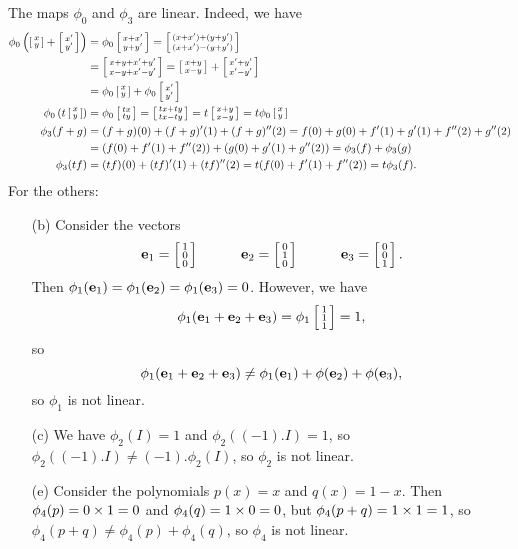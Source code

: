  The maps $\phi_0$ and $\phi_3$ are linear.  Indeed, we have
 \begin{align*}
  \phi_0\left(\bsm x\\ y\esm + \bsm x'\\ y'\esm\right) &=
  \phi_0\bsm x+x' \\ y+y' \esm =
  \bsm (x+x')+(y+y') \\ (x+x')-(y+y') \esm \\
  &= \bsm x+y+x'+y' \\ x-y+x'-y' \esm =
   \bsm x+y \\ x-y \esm + \bsm x'+y' \\ x'-y'\esm  \\
  &= \phi_0\bsm x\\ y\esm + \phi_0\bsm x'\\ y'\esm \\
  \phi_0\left(t\bsm x\\y\esm\right) &=
   \phi_0\bsm tx\\ ty \esm = \bsm tx+ty\\ tx-ty\esm =
   t\bsm x+y\\ x-y\esm = t\phi_0\bsm x\\ y\esm \\
  \phi_3(f+g) &=
   (f+g)(0) + (f+g)'(1) + (f+g)''(2)
   = f(0) + g(0) + f'(1) + g'(1) + f''(2) + g''(2) \\
   &= (f(0)+f'(1)+f''(2)) + (g(0)+g'(1)+g''(2))
    = \phi_3(f) + \phi_3(g) \\
  \phi_3(tf) &= (tf)(0) + (tf)'(1) + (tf)''(2)
    = t(f(0) + f'(1) + f''(2)) = t\phi_3(f).
 \end{align*}
 For the others:
 \begin{itemize}
  \item[(b)] Consider the vectors
   \[ \ve_1=\bsm 1\\0\\0 \esm \hspace{3em}
      \ve_2=\bsm 0\\1\\0 \esm \hspace{3em}
      \ve_3=\bsm 0\\0\\1 \esm.
   \]
   Then $\phi_1(\ve_1)=\phi_1(\ve_2)=\phi_1(\ve_3)=0$.  However,
   we have
   \[ \phi_1(\ve_1+\ve_2+\ve_3) = \phi_1\bsm 1\\1\\1\esm =  1, \]
   so
   \[ \phi_1(\ve_1+\ve_2+\ve_3)\neq
       \phi_1(\ve_1)+\phi(\ve_2)+\phi(\ve_3),
   \]
   so $\phi_1$ is not linear.
  \item[(c)] We have $\phi_2(I)=1$ and $\phi_2((-1).I)=1$,
   so $\phi_2((-1).I)\neq(-1).\phi_2(I)$, so $\phi_2$ is not
   linear.
  \item[(e)] Consider the polynomials $p(x)=x$ and
   $q(x)=1-x$.  Then $\phi_4(p)=0\tm 1=0$ and
   $\phi_4(q)=1\tm 0=0$, but $\phi_4(p+q)=1\tm 1=1$, so
   $\phi_4(p+q)\neq\phi_4(p)+\phi_4(q)$, so $\phi_4$ is not
   linear.
 \end{itemize}
\EndDeferredSolution

